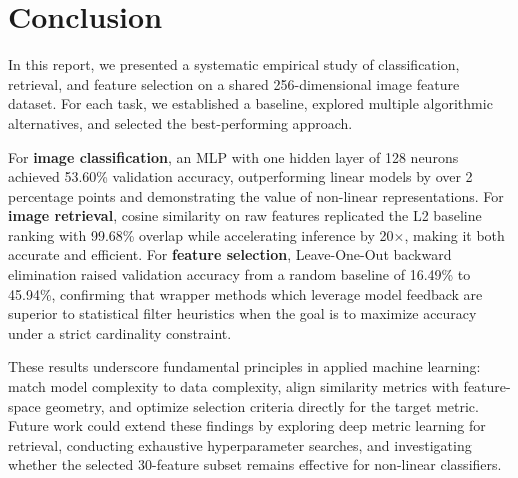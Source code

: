 \documentclass[onecolumn,a4paper,12pt]{IEEEtran}
\begin{document}
\section{Conclusion}
\label{sec:conclusion}

In this report, we presented a systematic empirical study of classification, retrieval, and feature selection on a shared 256-dimensional image feature dataset. For each task, we established a baseline, explored multiple algorithmic alternatives, and selected the best-performing approach.

For \textbf{image classification}, an MLP with one hidden layer of 128 neurons achieved 53.60\% validation accuracy, outperforming linear models by over 2 percentage points and demonstrating the value of non-linear representations. For \textbf{image retrieval}, cosine similarity on raw features replicated the L2 baseline ranking with 99.68\% overlap while accelerating inference by 20$\times$, making it both accurate and efficient. For \textbf{feature selection}, Leave-One-Out backward elimination raised validation accuracy from a random baseline of 16.49\% to 45.94\%, confirming that wrapper methods which leverage model feedback are superior to statistical filter heuristics when the goal is to maximize accuracy under a strict cardinality constraint.

These results underscore fundamental principles in applied machine learning: match model complexity to data complexity, align similarity metrics with feature-space geometry, and optimize selection criteria directly for the target metric. Future work could extend these findings by exploring deep metric learning for retrieval, conducting exhaustive hyperparameter searches, and investigating whether the selected 30-feature subset remains effective for non-linear classifiers.

\newpage



\end{document}
